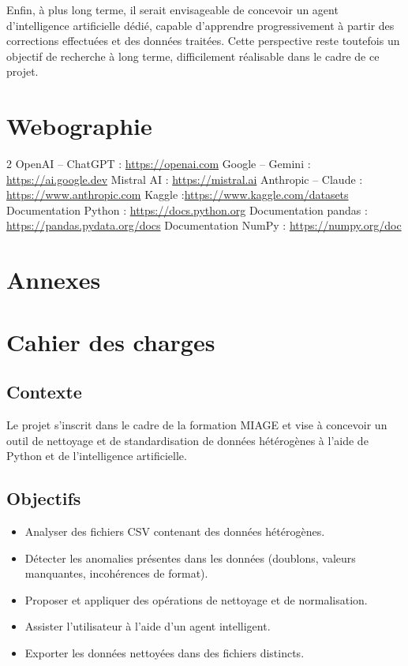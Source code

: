 \documentclass[a4paper, 12pt, twoside]{article}
\begin{document}
Enfin, à plus long terme, il serait envisageable de concevoir un agent d’intelligence artificielle dédié, capable d’apprendre progressivement à partir des corrections effectuées et des données traitées. Cette perspective reste toutefois un objectif de recherche à long terme, difficilement réalisable dans le cadre de ce projet.

\newpage
\section{Webographie}
\begin{thebibliography}{2}
     OpenAI – ChatGPT : \url{https://openai.com}
     Google – Gemini : \url{https://ai.google.dev}
     Mistral AI : \url{https://mistral.ai}
     Anthropic – Claude : \url{https://www.anthropic.com}
     Kaggle :\url{https://www.kaggle.com/datasets}
     Documentation Python : \url{https://docs.python.org}
     Documentation pandas : \url{https://pandas.pydata.org/docs}
     Documentation NumPy : \url{https://numpy.org/doc}
\end{thebibliography}

\newpage
\section{Annexes}
\appendix
\makeatletter
\def\@seccntformat#1{Annexe~\csname the#1\endcsname:\quad}
\makeatother
	\section{Cahier des charges}
\subsection*{Contexte}
Le projet s’inscrit dans le cadre de la formation MIAGE et vise à concevoir un outil de nettoyage et de standardisation de données hétérogènes à l’aide de Python et de l'intelligence artificielle.

\subsection*{Objectifs}
\begin{itemize}
    \item Analyser des fichiers CSV contenant des données hétérogènes.
    \item Détecter les anomalies présentes dans les données (doublons, valeurs manquantes, incohérences de format).
    \item Proposer et appliquer des opérations de nettoyage et de normalisation.
    \item Assister l’utilisateur à l’aide d’un agent intelligent.
    \item Exporter les données nettoyées dans des fichiers distincts.
\end{itemize}
\end{document}
